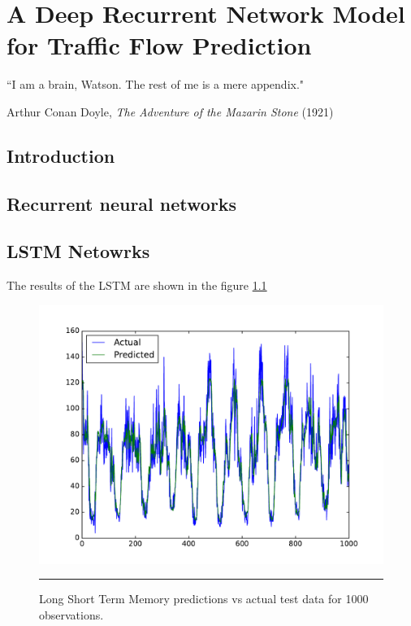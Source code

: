 
\chapter{A Deep Recurrent Network Model for Traffic Flow Prediction} %

\label{Chapter4} %


{``I am a brain, Watson. The rest of me is a mere appendix."}
\begin{flushright}
Arthur Conan Doyle, \textit{The Adventure of the Mazarin Stone} (1921)
\end{flushright}

\section{Introduction}

\section{Recurrent neural networks}

\section{LSTM Netowrks}

The results of the LSTM are shown in the figure \ref{fig:LstmActualPredicted}

\begin{figure}[htbp]
  \centering
    \includegraphics[width=\textwidth,height=\textheight,keepaspectratio]{Figures/lstm.pdf}
    \rule{35em}{0.5pt}
  \caption[LSTM - Actual vs Predictions]{Long Short Term Memory predictions vs actual test data for 
  1000 observations.}
  \label{fig:LstmActualPredicted}
\end{figure}